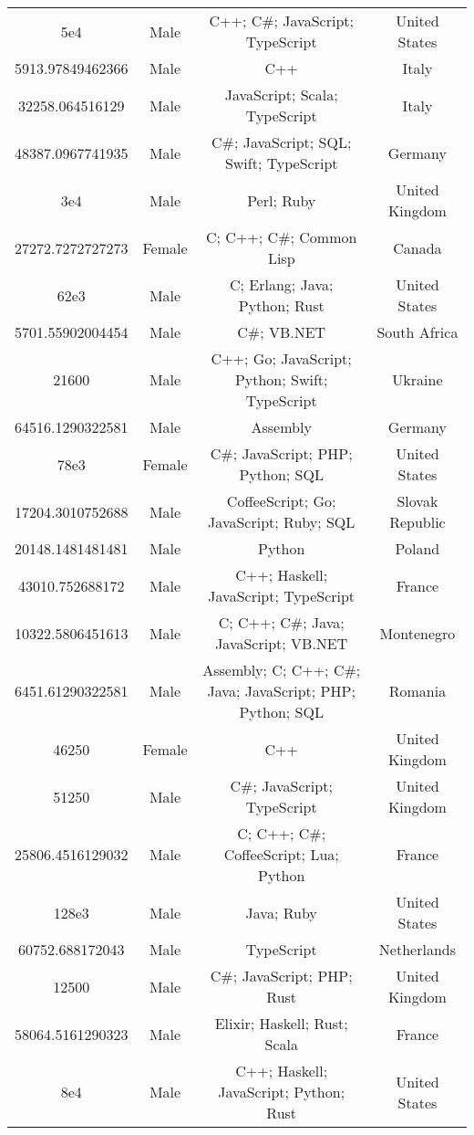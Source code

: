 \begin{center}
\begin{tabular}{ |c|c|c|c| }
5e4  &  Male  &  C++; C\#; JavaScript; TypeScript  &  United States  \\ 
5913.97849462366  &  Male  &  C++  &  Italy  \\ 
32258.064516129  &  Male  &  JavaScript; Scala; TypeScript  &  Italy  \\ 
48387.0967741935  &  Male  &  C\#; JavaScript; SQL; Swift; TypeScript  &  Germany  \\ 
3e4  &  Male  &  Perl; Ruby  &  United Kingdom  \\ 
27272.7272727273  &  Female  &  C; C++; C\#; Common Lisp  &  Canada  \\ 
62e3  &  Male  &  C; Erlang; Java; Python; Rust  &  United States  \\ 
5701.55902004454  &  Male  &  C\#; VB.NET  &  South Africa  \\ 
21600  &  Male  &  C++; Go; JavaScript; Python; Swift; TypeScript  &  Ukraine  \\ 
64516.1290322581  &  Male  &  Assembly  &  Germany  \\ 
78e3  &  Female  &  C\#; JavaScript; PHP; Python; SQL  &  United States  \\ 
17204.3010752688  &  Male  &  CoffeeScript; Go; JavaScript; Ruby; SQL  &  Slovak Republic  \\ 
20148.1481481481  &  Male  &  Python  &  Poland  \\ 
43010.752688172  &  Male  &  C++; Haskell; JavaScript; TypeScript  &  France  \\ 
10322.5806451613  &  Male  &  C; C++; C\#; Java; JavaScript; VB.NET  &  Montenegro  \\ 
6451.61290322581  &  Male  &  Assembly; C; C++; C\#; Java; JavaScript; PHP; Python; SQL  &  Romania  \\ 
46250  &  Female  &  C++  &  United Kingdom  \\ 
51250  &  Male  &  C\#; JavaScript; TypeScript  &  United Kingdom  \\ 
25806.4516129032  &  Male  &  C; C++; C\#; CoffeeScript; Lua; Python  &  France  \\ 
128e3  &  Male  &  Java; Ruby  &  United States  \\ 
60752.688172043  &  Male  &  TypeScript  &  Netherlands  \\ 
12500  &  Male  &  C\#; JavaScript; PHP; Rust  &  United Kingdom  \\ 
58064.5161290323  &  Male  &  Elixir; Haskell; Rust; Scala  &  France  \\ 
8e4  &  Male  &  C++; Haskell; JavaScript; Python; Rust  &  United States  \\ 

\end{tabular}
\end{center}
